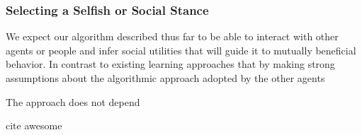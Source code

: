 
\subsubsection*{\large Selecting a Selfish or Social Stance}
\label{sec:stance}

We expect our algorithm described thus far to be able to interact with
other agents or people and infer social utilities that will guide it
to mutually beneficial behavior. In contrast to existing learning
approaches that 
by making strong assumptions about the algorithmic approach adopted by
the other agents~\cite{conitzer07}

The approach does not depend 

cite awesome


